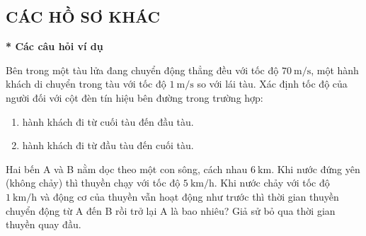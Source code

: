 \subsection{CÁC HỒ SƠ KHÁC}
\textbf{* Các câu hỏi ví dụ}\\
\setcounter{ex}{0}
\begin{ex}
	Bên trong một tàu lửa đang chuyển động thẳng đều với tốc độ $\SI{70}{\meter/\second}$, một hành khách di chuyển trong tàu với tốc độ $\SI{1}{\meter/\second}$ so với lái tàu. Xác định tốc độ của người đối với cột đèn tín hiệu bên đường trong trường hợp:
	\begin{enumerate}[label=\alph*)]
		\item hành khách đi từ cuối tàu đến đầu tàu.
		\item hành khách đi từ đầu tàu đến cuối tàu.
	\end{enumerate}
	
\end{ex}
\begin{ex}
	Hai bến A và B nằm dọc theo một con sông, cách nhau $\SI{6}{\kilo\meter}$. Khi nước đứng yên (không chảy) thì thuyền chạy với tốc độ $\SI{5}{\kilo\meter/\hour}$. Khi nước chảy  với tốc độ $\SI{1}{\kilo\meter/\hour}$ và động cơ của thuyền vẫn hoạt động như trước thì thời gian thuyền chuyển động từ A đến B rồi trở lại A là bao nhiêu? Giả sử bỏ qua thời gian thuyền quay đầu.
	
\end{ex}